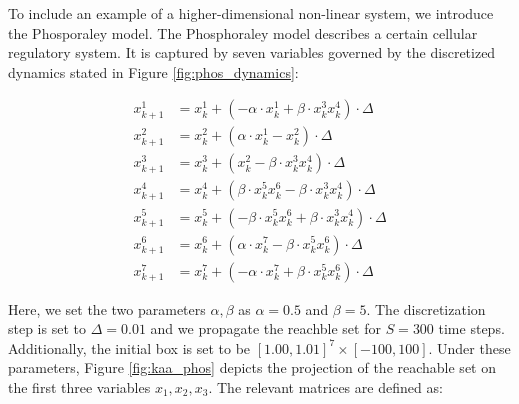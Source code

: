 \begin{example}
To include an example of a higher-dimensional non-linear system, we introduce the Phosporaley model. The Phosphoraley model describes a certain cellular regulatory system. It is captured by seven variables governed by the discretized dynamics stated in Figure \ref{fig:phos_dynamics}:

\begin{center}
  \begin{equation*}
    \begin{split}
        x^1_{k+1} &= x^1_k + ( -\alpha \cdot x^1_k + \beta \cdot x^3_k x^4_k)\cdot \Delta \\
        x^2_{k+1} &= x^2_k + (  \alpha\cdot  x^1_k - x^2_k)\cdot \Delta \\
        x^3_{k+1} &= x^3_k + ( x^2_k - \beta \cdot x^3_k x^4_k)\cdot \Delta \\
        x^4_{k+1} &= x^4_k + ( \beta \cdot x^5_k x^6_k - \beta \cdot x^3_k x^4_k)\cdot \Delta \\
        x^5_{k+1} &= x^5_k + ( -\beta \cdot x^5_k x^6_k + \beta \cdot x^3_k x^4_k)\cdot \Delta \\
        x^6_{k+1} &= x^6_k + ( \alpha\cdot  x^7_k - \beta \cdot x^5_k x^6_k)\cdot \Delta \\
        x^7_{k+1} &= x^7_k + ( -\alpha\cdot  x^7_k + \beta \cdot  x^5_k x^6_k)\cdot \Delta
    \end{split}
  \end{equation*}
  \label{fig:phos_dynamics}
\end{center}
%
Here, we set the two parameters $\alpha,\beta$ as $\alpha=0.5$ and $\beta=5$. The discretization step is set to $\Delta =0.01$ and we propagate the reachble set for $S=300$ time steps. Additionally, the initial box is set to be $[1.00,1.01]^7 \times [-100, 100]$. Under these parameters, Figure \ref{fig:kaa_phos} depicts the projection of the reachable set on the first three variables $x_1, x_2, x_3$. The relevant matrices are defined as:


\end{example}
